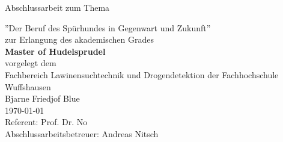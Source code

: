 %
%
%
%

\begin{titlepage}
\vspace{4em}
\center
\Large{\textsf{Abschlussarbeit zum Thema}}
\vspace{1em}

\Huge{\textsf{''Der Beruf des Spürhundes in Gegenwart und Zukunft''}}
\vspace{2em}
\\
\Large{
	\textsf{
		zur Erlangung des akademischen Grades\\
		\textbf{Master of Hudelsprudel}
		\vspace{2em}
		\\
		vorgelegt dem\\
		Fachbereich Lawinensuchtechnik und Drogendetektion der Fachhochschule Wuffshausen
		}
	}
\vspace{2em}
\\
\Large{
	\textsf{
		Bjarne Friedjof Blue\\
		\today
		\vspace{2em}
		\\
		Referent: Prof. Dr. No\\
		Abschlussarbeitsbetreuer: Andreas Nitsch
	}
}

\end{titlepage}
